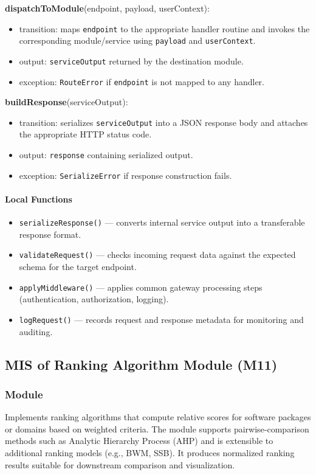 \documentclass[12pt, titlepage]{article}
\begin{document}
  \noindent \textbf{dispatchToModule}(endpoint, payload, userContext):
  \begin{itemize}
    \item transition: maps \texttt{endpoint} to the appropriate handler routine and invokes the corresponding module/service using \texttt{payload} and \texttt{userContext}.
    \item output: \texttt{serviceOutput} returned by the destination module.
    \item exception: \texttt{RouteError} if \texttt{endpoint} is not mapped to any handler.
  \end{itemize}

  \noindent \textbf{buildResponse}(serviceOutput):
  \begin{itemize}
    \item transition: serializes \texttt{serviceOutput} into a JSON response body and attaches the appropriate HTTP status code.
    \item output: \texttt{response} containing serialized output.
    \item exception: \texttt{SerializeError} if response construction fails.
  \end{itemize}

  \paragraph{Local Functions}
  \begin{itemize}
    \item \texttt{serializeResponse()} — converts internal service output into a transferable response format.
    \item \texttt{validateRequest()} — checks incoming request data against the expected schema for the target endpoint.
    \item \texttt{applyMiddleware()} — applies common gateway processing steps (authentication, authorization, logging).
    \item \texttt{logRequest()} — records request and response metadata for monitoring and auditing.
  \end{itemize}


\subsection{MIS of Ranking Algorithm Module (M11)}
  \label{mis:RankingAlgorithm}

  \subsubsection{Module}
  Implements ranking algorithms that compute relative scores for software packages
  or domains based on weighted criteria. The module supports pairwise-comparison
  methods such as Analytic Hierarchy Process (AHP) and is extensible to additional
  ranking models (e.g., BWM, SSB). It produces normalized ranking results suitable
  for downstream comparison and visualization.
\end{document}
